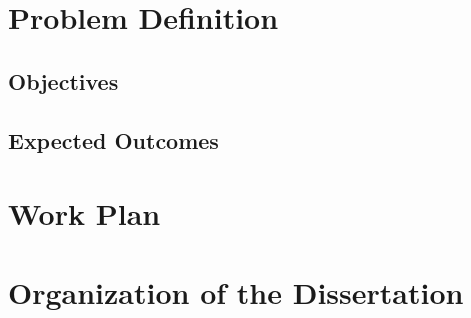 

\section{Problem Definition}
\label{sec:Ch1.2}



\subsection{Objectives}
\label{sub:Ch1.2.1}



\subsection{Expected Outcomes}
\label{sub:Ch1.2.2}



\section{Work Plan}
\label{sec:Ch1.3}





\section{Organization of the Dissertation}
\label{sec:Ch1.4}




